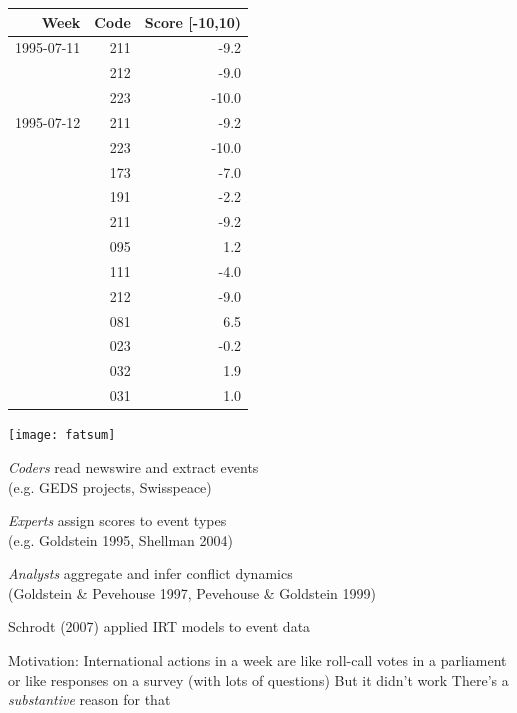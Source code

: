 \documentclass{mediumfoils}
\newcommand{\mkgrey}[1]{{\color{pale}#1}}
\begin{document}
\newpage


\begin{center} 
{\footnotesize
\begin{tabular}{rrr} \toprule
Week       & Code & Score [-10,10) \\ \midrule
1995-07-11 & 211 & -9.2 \\
 & 212 & -9.0 \\
 & 223 & -10.0 \\ \midrule
1995-07-12 & 211 & -9.2 \\
 & 223 & -10.0 \\
 & 173 & -7.0 \\
 & 191 & -2.2 \\
 & 211 & -9.2 \\
 & 095 & 1.2 \\
 & 111 & -4.0  \\
 & 212 & -9.0 \\
 & 081 & 6.5 \\
 & 023 & -0.2 \\
 & 032 & 1.9 \\
 & 031 & 1.0 \\ \bottomrule
\end{tabular}
}
\end{center}


\centerline{\texttt{[image: fatsum]}}


\textit{Coders} read newswire and extract events\\ \mkgrey{(e.g. GEDS projects, Swisspeace)}

\textit{Experts} assign scores to event types\\
\mkgrey{(e.g. Goldstein 1995, Shellman 2004)}

\textit{Analysts} aggregate and infer conflict dynamics\\ \mkgrey{(Goldstein \& Pevehouse 1997, Pevehouse \& Goldstein 1999)}


Schrodt (2007) applied IRT models to event data

Motivation: 
\ita
\itm International actions in a week are like roll-call votes in a parliament 
\itm or like responses on a survey (with lots of questions) 
\itz 
\pause 
But it didn't work
\pause
There's a \textit{substantive} reason for that
\end{document}
